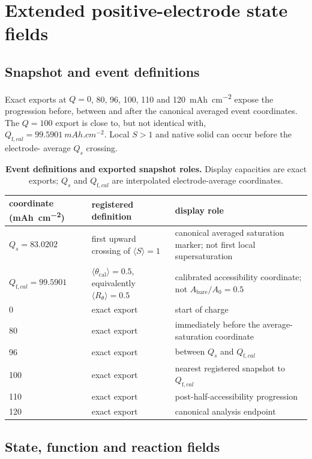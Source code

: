 \documentclass[11pt]{article}
\let\SIorigsubsection\subsection
\renewcommand{\subsection}{\FloatBarrier\SIorigsubsection}
\newcommand{\thetacal}{\theta_{\mathrm{cal}}}
\newcommand{\Rtheta}{R_{\theta}}
\newcommand{\mAhcm}{\si{mAh.cm^{-2}}}
\begin{document}
\section{Extended positive-electrode state fields}

\subsection{Snapshot and event definitions}

Exact exports at $Q=0$, 80, 96, 100, 110 and \SI{120}{mAh.cm^{-2}} expose the progression before, between
and after the canonical averaged event coordinates. The $Q=100$ export is close to, but not identical with,
$Q_{\mathrm f,cal}=\SI{99.5901}{mAh.cm^{-2}}$. Local $S>1$ and native solid can occur before the electrode-
average $Q_s$ crossing.

\begin{table}[!htbp]
\centering\small
\caption{\textbf{Event definitions and exported snapshot roles.} Display capacities are exact exports;
$Q_s$ and $Q_{\mathrm f,cal}$ are interpolated electrode-average coordinates.}
\label{tab:snapshots}
\begin{tabularx}{\textwidth}{@{}P{2.3cm}P{3.0cm}Y@{}}
\toprule
coordinate (\mAhcm) & registered definition & display role\\
\midrule
$Q_s=83.0202$ & first upward crossing of $\langle S\rangle=1$ & canonical averaged saturation marker; not first local supersaturation\\
$Q_{\mathrm f,cal}=99.5901$ & $\langle\thetacal\rangle=0.5$, equivalently $\langle\Rtheta\rangle=0.5$ & calibrated accessibility coordinate; not $A_{\mathrm{bare}}/A_0=0.5$\\
0 & exact export & start of charge\\
80 & exact export & immediately before the average-saturation coordinate\\
96 & exact export & between $Q_s$ and $Q_{\mathrm f,cal}$\\
100 & exact export & nearest registered snapshot to $Q_{\mathrm f,cal}$\\
110 & exact export & post-half-accessibility progression\\
120 & exact export & canonical analysis endpoint\\
\bottomrule
\end{tabularx}
\end{table}

\subsection{State, function and reaction fields}
\end{document}
